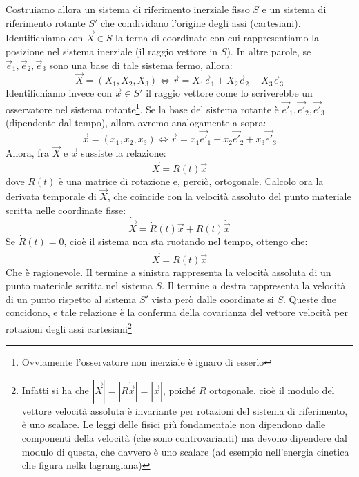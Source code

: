 \documentclass[a4paper,openany]{article}
\begin{document}
	Costruiamo allora un sistema di riferimento inerziale fisso $S$ e un sistema di riferimento rotante $S'$ che condividano l'origine degli assi (cartesiani). Identifichiamo con $\vec{X}\in S$ la terna di coordinate con cui rappresentiamo la posizione nel sistema inerziale (il raggio vettore in $S$). In altre parole, se $\vec{e}_{1},\vec{e}_{2},\vec{e}_{3}$ sono una base di tale sistema fermo, allora:
	$$
	\vec{X} = (X_1,X_2,X_3) \iff \vec{r} = X_1
	\vec{e}_1 + X_2
	\vec{e}_2 +X_3 \vec{e}_3$$
	Identifichiamo invece con $\vec{x}\in S'$ il raggio vettore come lo scriverebbe un osservatore nel sistema rotante\footnote{Ovviamente l'osservatore non inerziale è ignaro di esserlo}. Se la base del sistema rotante è $\vec{e'}_{1},\vec{e'}_{2},\vec{e'}_{3}$ (dipendente dal tempo), allora avremo analogamente a sopra:
	$$
	\vec{x} = (x_1,x_2,x_3) \iff \vec{r} = x_1
	\vec{e'}_1 + x_2
	\vec{e'}_2 +x_3 \vec{e'}_3
	$$
	Allora, fra $\vec{X}$ e $\vec{x}$ sussiste la relazione:
	$$
	\vec{X} = R(t)\vec{x}
	$$
	dove $R(t)$ è una matrice di rotazione e, perciò, ortogonale. Calcolo ora la derivata temporale di $\vec{X}$, che coincide con la velocità assoluto del punto materiale scritta nelle coordinate fisse:
	$$
	\dot{\vec{X}} = \dot{R}(t)\vec{x} + R(t)\dot{\vec{x}}
	$$
	Se $\dot{R}(t) = 0$, cioè il sistema non sta ruotando nel tempo, ottengo che:
	$$
	\dot{\vec{X}} = R(t)\dot{\vec{x}}
	$$
	Che è ragionevole. Il termine a sinistra rappresenta la velocità assoluta di un punto materiale scritta nel sistema $S$. Il termine a destra rappresenta la velocità di un punto rispetto al sistema $S'$ vista però dalle coordinate si $S$. Queste due concidono, e tale relazione è la conferma della covarianza del vettore velocità per rotazioni degli assi cartesiani\footnote{Infatti si ha che $|\dot{\vec{X}}| = |R\dot{\vec{x}}| = |\dot{\vec{x}}|$, poiché $R$ ortogonale, cioè il modulo del vettore velocità assoluta è invariante per rotazioni del sistema di riferimento, è uno scalare. Le leggi delle fisici più fondamentale non dipendono dalle componenti della velocità (che sono controvarianti) ma devono dipendere dal modulo di questa, che davvero è uno scalare (ad esempio nell'energia cinetica che figura nella lagrangiana)}
	
\end{document}
